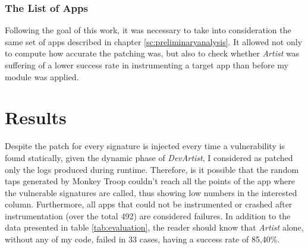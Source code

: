 \subsubsection{The List of Apps}
Following the goal of this work, it was necessary to take into consideration the same set of apps described in chapter \ref{sc:preliminaryanalysis}. It allowed not only to compute how accurate the patching was, but also to check whether \emph{Artist} was suffering of a lower success rate in instrumenting a target app than before my module was applied.   

\section{Results}
Despite the patch for every signature is injected every time a vulnerability is found statically, given the dynamic phase of \emph{DevArtist}, I considered as patched only the logs produced during runtime. Therefore, is it possible that the random taps generated by Monkey Troop couldn't reach all the points of the app where the vulnerable signatures are called, thus showing low numbers in the interested column. Furthermore, all apps that could not be instrumented or crashed after instrumentation (over the total 492) are considered failures. In addition to the data presented in table \ref{tab:evaluation}, the reader should know that \emph{Artist} alone, without any of my code, failed in 33 cases, having a success rate of 85,40\%.
\vspace{1.5cm}
